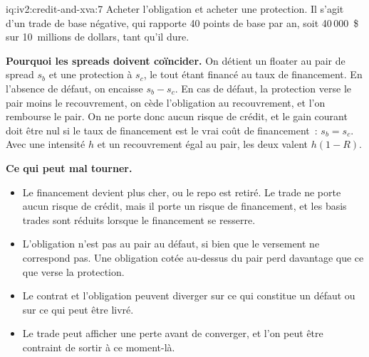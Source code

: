 \begin{solution}{iq:iv2:credit-and-xva:7}
Acheter l'obligation et acheter une protection. Il s'agit d'un trade de base négative, qui rapporte 40 points de base par an, soit 40\,000~\$ sur 10~millions de dollars, tant qu'il dure.

\textbf{Pourquoi les spreads doivent coïncider.} On détient un floater au pair de spread $s_b$ et une protection à $s_c$, le tout étant financé au taux de financement. En l'absence de défaut, on encaisse $s_b - s_c$. En cas de défaut, la protection verse le pair moins le recouvrement, on cède l'obligation au recouvrement, et l'on rembourse le pair. On ne porte donc aucun risque de crédit, et le gain courant doit être nul si le taux de financement est le vrai coût de financement~: $s_b = s_c$. Avec une intensité $h$ et un recouvrement égal au pair, les deux valent $h(1 - R)$.

\textbf{Ce qui peut mal tourner.}
\begin{itemize}
\item Le financement devient plus cher, ou le repo est retiré. Le trade ne porte aucun risque de crédit, mais il porte un risque de financement, et les basis trades sont réduits lorsque le financement se resserre.
\item L'obligation n'est pas au pair au défaut, si bien que le versement ne correspond pas. Une obligation cotée au-dessus du pair perd davantage que ce que verse la protection.
\item Le contrat et l'obligation peuvent diverger sur ce qui constitue un défaut ou sur ce qui peut être livré.
\item Le trade peut afficher une perte avant de converger, et l'on peut être contraint de sortir à ce moment-là.
\end{itemize}

\end{solution}


